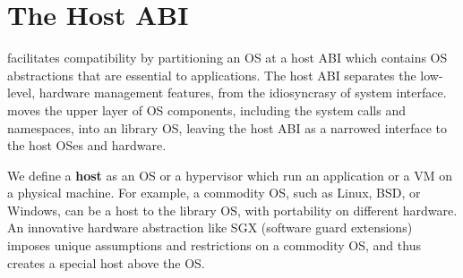 \section{The Host ABI}
\label{sec:overview:host}


\graphene{} facilitates compatibility
by partitioning an OS
at a host ABI which contains
OS abstractions
that are essential to applications.
The host ABI separates the low-level, hardware management features, from the idiosyncrasy of system interface. 
\graphene{} moves the upper layer of OS components,
including the system calls and namespaces, into an library OS,
leaving the host ABI 
as a narrowed interface to the host OSes and hardware.






 
We define a {\bf host} as an OS or a hypervisor
which run an application or a VM
on a physical machine.
For example, a commodity OS, such as Linux, BSD, or Windows, can be a host to the library OS,
with portability on different hardware.
An innovative hardware abstraction like SGX (software guard extensions)
imposes unique assumptions and restrictions
on a commodity OS,
and thus creates a special host above the OS.



